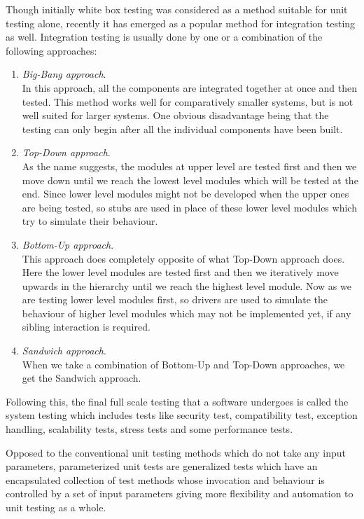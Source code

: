 Though initially white box testing was considered as a method suitable for unit testing alone, recently it has emerged as a popular method for integration testing as well. Integration testing is usually done by one or a combination of the following approaches: 
\begin{enumerate}[\IEEEsetlabelwidth{Z}]
\item \textit{Big-Bang approach}.\\In this approach, all the components are integrated together at once and then tested. This method works well for comparatively smaller systems, but is not well suited for larger systems. One obvious disadvantage being that the testing can only begin after all the individual components have been built.
\item \textit{Top-Down approach}.\\As the name suggests, the modules at upper level are tested first and then we move down until we reach the lowest level modules which will be tested at the end. Since lower level modules might not be developed when the upper ones are being tested, so stubs are used in place of these lower level modules which try to simulate their behaviour.
\item \textit{Bottom-Up approach}.\\This approach does completely opposite of what Top-Down approach does. Here the lower level modules are tested first and then we iteratively move upwards in the hierarchy until we reach the highest level module. Now as we are testing lower level modules first, so drivers are used to simulate the behaviour of higher level modules which may not be implemented yet, if any sibling interaction is required. 
\item \textit{Sandwich approach}.\\ When we take a combination of Bottom-Up and Top-Down approaches, we get the Sandwich approach.
\end{enumerate}
Following this, the final full scale testing that a software undergoes is called the system testing which includes tests like security test, compatibility test, exception handling, scalability tests, stress tests and some performance tests. 

Opposed to the conventional unit testing methods which do not take any input parameters, parameterized unit tests \cite{tillmann2010parameterized} are generalized tests which have an encapsulated collection of test methods whose invocation and behaviour is controlled by a set of input parameters giving more flexibility and automation to unit testing as a whole.

